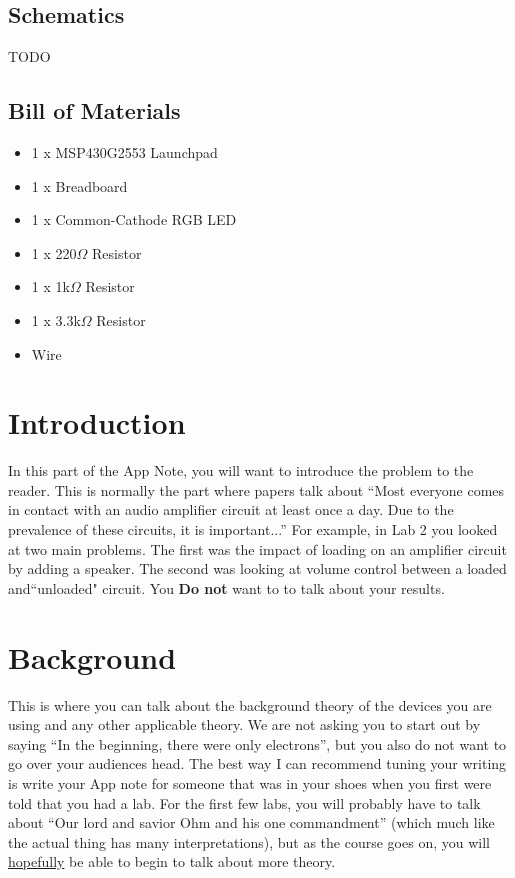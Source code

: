 \documentclass{hitec}
\begin{document}
\subsection{Schematics}
TODO

\subsection{Bill of Materials}
\begin{itemize}
\item 1 x MSP430G2553 Launchpad
\item 1 x Breadboard
\item 1 x Common-Cathode RGB LED
\item 1 x 220$\Omega$ Resistor
\item 1 x 1k$\Omega$ Resistor
\item 1 x 3.3k$\Omega$ Resistor
\item Wire
\end{itemize}

\iffalse

\section{Introduction}
In this part of the App Note, you will want to introduce the problem to the reader. This is normally the part where papers talk about ``Most everyone comes in contact with an audio amplifier circuit at least once a day. Due to the prevalence of these circuits, it is important...'' For example, in Lab 2 you looked at two main problems. The first was the impact of loading on an amplifier circuit by adding a speaker. The second was looking at volume control between a loaded and``unloaded" circuit. You \textbf{Do not} want to to talk about your results. 



\section{Background}
This is where you can talk about the background theory of the devices you are using and any other applicable theory. We are not asking you to start out by saying ``In the beginning, there were only electrons'', but you also do not want to go over your audiences head. The best way I can recommend tuning your writing is  write your App note for someone that was in your shoes when you first were told that you had a lab. For the first few labs, you will probably have to talk about ``Our lord and savior Ohm and his one commandment'' (which much like the actual thing has many interpretations), but as the course goes on, you will \underline{hopefully} be able to begin to talk about more theory.
\\
\end{document}
